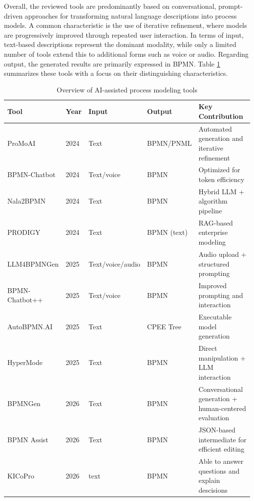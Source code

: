 Overall, the reviewed tools are predominantly based on conversational, prompt-driven approaches for transforming natural language descriptions into process models. A common characteristic is the use of iterative refinement, where models are progressively improved through repeated user interaction. In terms of input, text-based descriptions represent the dominant modality, while only a limited number of tools extend this to additional forms such as voice or audio. Regarding output, the generated results are primarily expressed in BPMN. Table \ref{tab:lr_tools} summarizes these tools with a focus on their distinguishing characteristics.

\begin{table}[htb!]
\centering
\caption{Overview of AI-assisted process modeling tools}
\label{tab:lr_tools}
\begin{tabular}{p{2.5cm} l p{2cm} p{2cm} p{4cm}}
\hline
\textbf{Tool} & \textbf{Year} & \textbf{Input} & \textbf{Output} & \textbf{Key Contribution} \\
\hline

ProMoAI & 2024 
& Text 
& BPMN/PNML
& Automated generation and iterative refinement \\
\hline
BPMN-Chatbot & 2024 
& Text/voice 
& BPMN
& Optimized for token efficiency \\
\hline
Nala2BPMN & 2024 
& Text 
& BPMN
& Hybrid LLM + algorithm pipeline \\
\hline
PRODIGY & 2024 
& Text 
& BPMN (text)
& RAG-based enterprise modeling \\
\hline
LLM4BPMNGen & 2025 
& Text/voice/audio
& BPMN
& Audio upload + structured prompting \\
\hline
BPMN-Chatbot++ & 2025 
& Text/voice 
& BPMN
& Improved prompting and interaction \\
\hline
AutoBPMN.AI & 2025 
& Text 
& CPEE Tree
& Executable model generation \\
\hline
HyperMode & 2025 
& Text
& BPMN 
& Direct manipulation + LLM interaction \\
\hline
BPMNGen & 2026 
& Text 
& BPMN
& Conversational generation + human-centered evaluation \\
\hline
BPMN Assist & 2026 
& Text 
& BPMN
& JSON-based intermediate for efficient editing \\
\hline
KICoPro & 2026 
& text
& BPMN
& Able to answer questions and explain descisions \\

\hline
\end{tabular}

\end{table}

